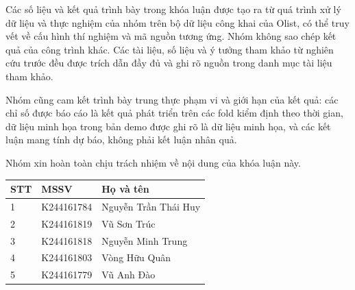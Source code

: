 Các số liệu và kết quả trình bày trong khóa luận được tạo ra từ quá trình xử lý dữ liệu và thực nghiệm của nhóm trên bộ dữ liệu công khai của Olist, có thể truy vết về cấu hình thí nghiệm và mã nguồn tương ứng. Nhóm không sao chép kết quả của công trình khác. Các tài liệu, số liệu và ý tưởng tham khảo từ nghiên cứu trước đều được trích dẫn đầy đủ và ghi rõ nguồn trong danh mục tài liệu tham khảo.

Nhóm cũng cam kết trình bày trung thực phạm vi và giới hạn của kết quả: các chỉ số được báo cáo là kết quả phát triển trên các fold kiểm định theo thời gian, dữ liệu minh họa trong bản demo được ghi rõ là dữ liệu minh họa, và các kết luận mang tính dự báo, không phải kết luận nhân quả.

Nhóm xin hoàn toàn chịu trách nhiệm về nội dung của khóa luận này.

\vspace{1cm}
\begin{center}
\begin{tabular}{@{}lll@{}}
\toprule
STT & MSSV & Họ và tên \\
\midrule
1 & K244161784 & Nguyễn Trần Thái Huy \\
2 & K244161819 & Vũ Sơn Trúc \\
3 & K244161818 & Nguyễn Minh Trung \\
4 & K244161803 & Vòng Hữu Quân \\
5 & K244161779 & Vũ Anh Đào \\
\bottomrule
\end{tabular}
\end{center}

